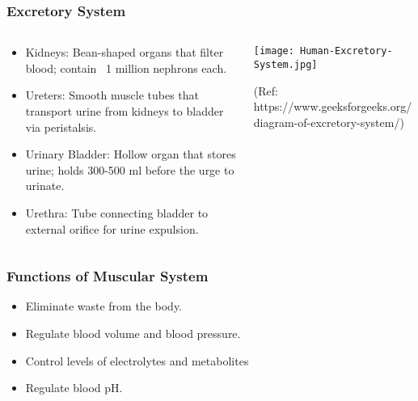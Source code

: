 \begin{frame}[fragile]\frametitle{Excretory System}
\begin{columns}
    \begin{column}[T]{0.5\linewidth}
      \begin{itemize}
		\item Kidneys: Bean-shaped organs that filter blood; contain ~1 million nephrons each.
		\item Ureters: Smooth muscle tubes that transport urine from kidneys to bladder via peristalsis.
		\item Urinary Bladder: Hollow organ that stores urine; holds 300-500 ml before the urge to urinate.
		\item Urethra: Tube connecting bladder to external orifice for urine expulsion.
	  \end{itemize}
    \end{column}
    \begin{column}[T]{0.5\linewidth}
		\begin{center}
		\texttt{[image: Human-Excretory-System.jpg]}
		
		{\tiny (Ref: https://www.geeksforgeeks.org/diagram-of-excretory-system/)}
		\end{center}	
    \end{column}
  \end{columns}
\end{frame}
\begin{frame}[fragile]\frametitle{Functions of Muscular System }

      \begin{itemize}
		\item Eliminate waste from the body.
		\item Regulate blood volume and blood pressure.
		\item Control levels of electrolytes and metabolites
		\item Regulate blood pH.

	  \end{itemize}

\end{frame}

